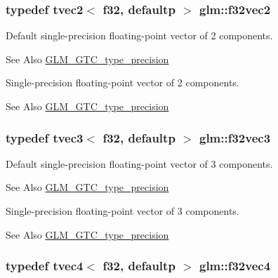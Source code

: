 \hypertarget{group__gtc__type__precision_ga8681dee3524dea86388178c49c27079a}{
\subsubsection[{f32vec2}]{\setlength{\rightskip}{0pt plus 5cm}typedef tvec2$<$ f32, defaultp $>$ {\bf glm\-::f32vec2}}}\label{group__gtc__type__precision_ga8681dee3524dea86388178c49c27079a}
Default single-\/precision floating-\/point vector of 2 components. \begin{DoxySeeAlso}{See Also}
\hyperlink{group__gtc__type__precision}{G\-L\-M\-\_\-\-G\-T\-C\-\_\-type\-\_\-precision}
\end{DoxySeeAlso}
Single-\/precision floating-\/point vector of 2 components. \begin{DoxySeeAlso}{See Also}
\hyperlink{group__gtc__type__precision}{G\-L\-M\-\_\-\-G\-T\-C\-\_\-type\-\_\-precision} 
\end{DoxySeeAlso}
\hypertarget{group__gtc__type__precision_gab550330e62a7bc3fa9e6740b9421037c}{
\subsubsection[{f32vec3}]{\setlength{\rightskip}{0pt plus 5cm}typedef tvec3$<$ f32, defaultp $>$ {\bf glm\-::f32vec3}}}\label{group__gtc__type__precision_gab550330e62a7bc3fa9e6740b9421037c}
Default single-\/precision floating-\/point vector of 3 components. \begin{DoxySeeAlso}{See Also}
\hyperlink{group__gtc__type__precision}{G\-L\-M\-\_\-\-G\-T\-C\-\_\-type\-\_\-precision}
\end{DoxySeeAlso}
Single-\/precision floating-\/point vector of 3 components. \begin{DoxySeeAlso}{See Also}
\hyperlink{group__gtc__type__precision}{G\-L\-M\-\_\-\-G\-T\-C\-\_\-type\-\_\-precision} 
\end{DoxySeeAlso}
\hypertarget{group__gtc__type__precision_ga6848e3b5cb5c1f4c117717b309e726eb}{
\subsubsection[{f32vec4}]{\setlength{\rightskip}{0pt plus 5cm}typedef tvec4$<$ f32, defaultp $>$ {\bf glm\-::f32vec4}}}\label{group__gtc__type__precision_ga6848e3b5cb5c1f4c117717b309e726eb}
